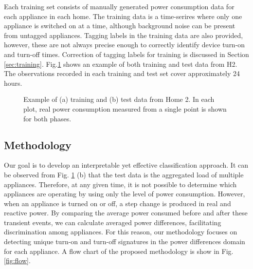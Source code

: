 \documentclass[conference]{IEEEtran}
\begin{document}
Each training set consists of manually generated power consumption data for each appliance in each home.  The training data is a time-serires where only one appliance is switched on at a time, although background noise can be present from untagged appliances.   Tagging labels in the training data are also provided, however, these are not always precise enough to correctly identify device turn-on and turn-off times. Correction of tagging labels for training is discussed in Section \ref{sec:training}.  Fig.\ref{fig:traintest} shows an example of both training and test data from H2.  The observations recorded in each training and test set cover approximately 24 hours.  

\begin{figure}[!h]	
	\centering
		\hfil
	\caption{Example of (a) training and (b) test data from Home 2.  In each plot, real power consumption measured from a single point is shown for both phases. } 
	\label{fig:traintest}
\end{figure}


\subsection{Methodology}
Our goal is to develop an interpretable yet effective classification approach.  It can be observed from Fig. \ref{fig:traintest} (b) that the test data is the aggregated load of multiple appliances.  Therefore, at any given time, it is not possible to determine which appliances are operating by using only the level of power consumption.  However, when an appliance is turned on or off, a step change is produced in real and reactive power.  By comparing the average power consumed before and after these transient events, we can calculate averaged power differences, facilitating discrimination among appliances.  For this reason, our methodology focuses on detecting unique turn-on and turn-off signatures in the power differences domain for each appliance.  A flow chart of the proposed methodology is show in Fig. \ref{fig:flow}.
\end{document}
